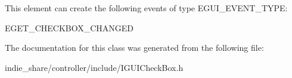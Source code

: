 \begin{DoxyParagraph}{This element can create the following events of type E\+G\+U\+I\+\_\+\+E\+V\+E\+N\+T\+\_\+\+T\+Y\+PE\+:}
\begin{DoxyItemize}
\item E\+G\+E\+T\+\_\+\+C\+H\+E\+C\+K\+B\+O\+X\+\_\+\+C\+H\+A\+N\+G\+ED \end{DoxyItemize}

\end{DoxyParagraph}


The documentation for this class was generated from the following file\+:\begin{DoxyCompactItemize}
\item 
indie\+\_\+share/controller/include/I\+G\+U\+I\+Check\+Box.\+h\end{DoxyCompactItemize}
